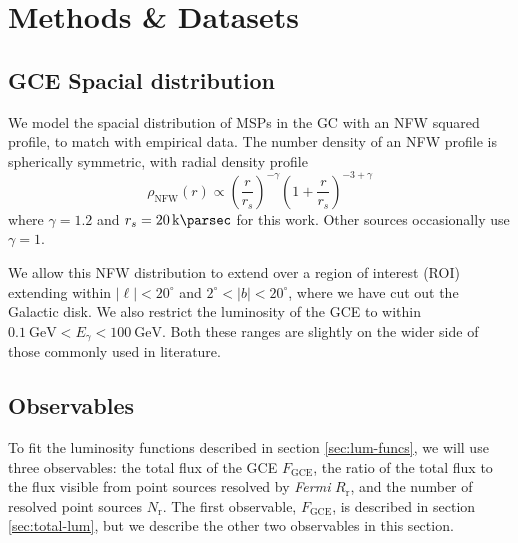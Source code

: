 \documentclass[a4paper,11pt]{article}
\newcommand{\parens}[1]{\left(#1\right)}
\newcommand{\comment}[1]{\emph{\color{red}{#1}}}
\begin{document}
\section{Methods \& Datasets}
\subsection{GCE Spacial distribution}
We model the spacial distribution of MSPs in the GC with an NFW squared profile, to match with empirical data. The number density of an NFW profile is spherically symmetric, with radial density profile
\label{sec:spacial-distro}
\begin{equation}
    \rho_\text{NFW}(r) \propto \parens{\frac{r}{r_s}}^{-\gamma}\parens{1 + \frac{r}{r_s}}^{-3+\gamma}
    \label{eqn:nfw}
\end{equation}
where $\gamma = 1.2$ and $r_s = \SI{20}{\kilo\parsec}$ for this work. Other sources occasionally use $\gamma = 1$.
\comment{The flux that comes from this NFW profile is unnormalizable. For most of the project, that doesn't matter because (l, b) = 0 is cut out. But for converting between ROIs, it means my former method was invalid.}

We allow this NFW distribution to extend over a region of interest (ROI) extending within $|\ell| < 20^\circ$ and $2^\circ < |b| < 20^\circ$, where we have cut out the Galactic disk. We also restrict the luminosity of the GCE to within $\SI{0.1}{\giga\electronvolt} < E_\gamma < \SI{100}{\giga\electronvolt}$. Both these ranges are slightly on the wider side of those commonly used in literature.


\subsection{Observables}
\label{sec:observables}
To fit the luminosity functions described in section \ref{sec:lum-funcs}, we will use three observables: the total flux of the GCE $F_\text{GCE}$, the ratio of the total flux to the flux visible from point sources resolved by \textit{Fermi} $R_\text{r}$, and the number of resolved point sources $N_\text{r}$. The first observable, $F_\text{GCE}$, is described in section \ref{sec:total-lum}, but we describe the other two observables in this section.
\end{document}
